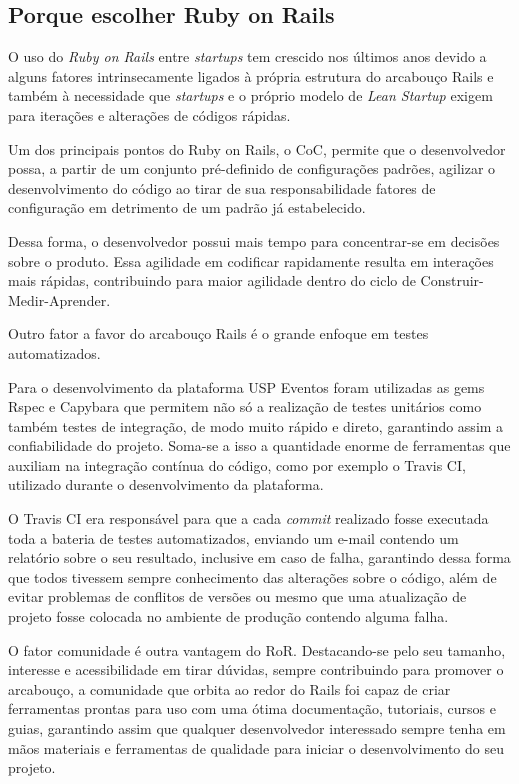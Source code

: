 \subsection{Porque escolher Ruby on Rails }
\par O uso do \emph{Ruby on Rails} entre \emph{startups} tem crescido nos últimos anos devido a alguns fatores intrinsecamente ligados à própria estrutura do arcabouço Rails e também à necessidade que \emph{startups} e o próprio modelo de \emph{Lean Startup} exigem para iterações e alterações de códigos rápidas. \citep{lilia:16}
\par Um dos principais pontos do Ruby on Rails, o CoC, permite que o desenvolvedor possa, a partir de um conjunto pré-definido de configurações padrões, agilizar o desenvolvimento do código ao tirar de sua responsabilidade fatores de configuração em detrimento de um padrão já estabelecido. \citep{morrice:15}
\par Dessa forma, o desenvolvedor possui mais tempo para concentrar-se em decisões sobre o produto. Essa agilidade em codificar rapidamente resulta em interações mais rápidas, contribuindo para maior agilidade dentro do ciclo de Construir-Medir-Aprender.
\par Outro fator a favor do arcabouço Rails é o grande enfoque em testes automatizados. \citep{morrice:15}
\par Para o desenvolvimento da plataforma USP Eventos foram utilizadas as gems Rspec e Capybara que permitem não só a realização de testes unitários como também testes de integração, de modo muito rápido e direto, garantindo assim a confiabilidade do projeto. Soma-se a isso a quantidade enorme de ferramentas que auxiliam na integração contínua do código, como por exemplo o Travis CI, utilizado durante o desenvolvimento da plataforma.
\par O Travis CI era responsável para que a cada \emph{commit} realizado fosse executada toda a bateria de testes automatizados, enviando um e-mail contendo um relatório sobre o seu resultado, inclusive em caso de falha, garantindo dessa forma que todos tivessem sempre conhecimento das alterações sobre o código, além de evitar problemas de conflitos de versões ou mesmo que uma atualização de projeto fosse colocada no ambiente de produção contendo alguma falha.
\par O fator comunidade é outra vantagem do RoR. Destacando-se pelo seu tamanho, interesse e acessibilidade em tirar dúvidas, sempre contribuindo para promover o arcabouço, a comunidade que orbita ao redor do Rails foi capaz de criar ferramentas prontas para uso com uma ótima documentação, tutoriais, cursos e guias, garantindo assim que qualquer desenvolvedor interessado sempre tenha em mãos materiais e ferramentas de qualidade para iniciar o desenvolvimento do seu projeto. \citep{lilia:16}
